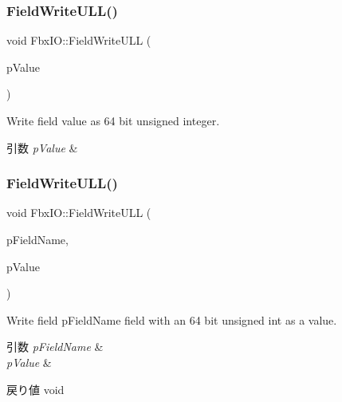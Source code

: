 \subsubsection{\texorpdfstring{Field\+Write\+U\+L\+L()}{FieldWriteULL()}\hspace{0.1cm}{\footnotesize\ttfamily [1/2]}}
{\footnotesize\ttfamily void Fbx\+I\+O\+::\+Field\+Write\+U\+LL (\begin{DoxyParamCaption}\item[{\hyperlink{fbxtypes_8h_a267f848573cc1e685aa510be4b1298c8}{Fbx\+U\+Long\+Long}}]{p\+Value }\end{DoxyParamCaption})}

Write field value as 64 bit unsigned integer. 
\begin{DoxyParams}{引数}
{\em p\+Value} & \\
\hline
\end{DoxyParams}
\mbox{\label{class_fbx_i_o_a16ecbb922b4ff5bc6982c63f493eb9aa}} 
\subsubsection{\texorpdfstring{Field\+Write\+U\+L\+L()}{FieldWriteULL()}\hspace{0.1cm}{\footnotesize\ttfamily [2/2]}}
{\footnotesize\ttfamily void Fbx\+I\+O\+::\+Field\+Write\+U\+LL (\begin{DoxyParamCaption}\item[{const char $\ast$}]{p\+Field\+Name,  }\item[{\hyperlink{fbxtypes_8h_a267f848573cc1e685aa510be4b1298c8}{Fbx\+U\+Long\+Long}}]{p\+Value }\end{DoxyParamCaption})}

Write field p\+Field\+Name field with an 64 bit unsigned int as a value. 
\begin{DoxyParams}{引数}
{\em p\+Field\+Name} & \\
\hline
{\em p\+Value} & \\
\hline
\end{DoxyParams}
\begin{DoxyReturn}{戻り値}
void 
\end{DoxyReturn}
\mbox{\label{class_fbx_i_o_ab15354aacbd29fe99299e5dc8fc14c55}} 

